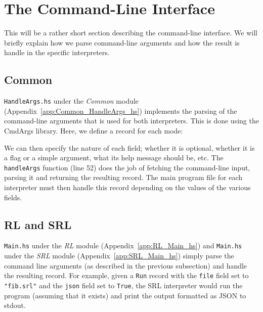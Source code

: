 \newpage
\section{The Command-Line Interface}
\label{sec:implementation_cli}

This will be a rather short section describing the command-line interface. We will briefly explain how we parse command-line arguments and how the result is handle in the specific interpreters.

\subsection{Common}

\texttt{HandleArgs.hs} under the \textit{Common} module (Appendix~\ref{app:Common_HandleArgs_hs}) implements the parsing of the command-line arguments that is used for both interpreters. This is done using the CmdArgs library. Here, we define a record for each mode:

We can then specify the nature of each field; whether it is optional, whether it is a flag or a simple argument, what its help message should be, etc. The \texttt{handleArgs} function (line 52) does the job of fetching the command-line input, parsing it and returning the resulting record. The main program file for each interpreter must then handle this record depending on the values of the various fields.

\subsection{RL and SRL}
\texttt{Main.hs} under the \textit{RL} module (Appendix~\ref{app:RL_Main_hs}) and \texttt{Main.hs} under the \textit{SRL} module (Appendix~\ref{app:SRL_Main_hs}) simply parse the command line arguments (as described in the previous subsection) and handle the resulting record. For example, given a \texttt{Run} record with the \texttt{file} field set to \texttt{"fib.srl"} and the \texttt{json} field set to \texttt{True}, the SRL interpreter would run the program (assuming that it exists) and print the output formatted as JSON to stdout.

